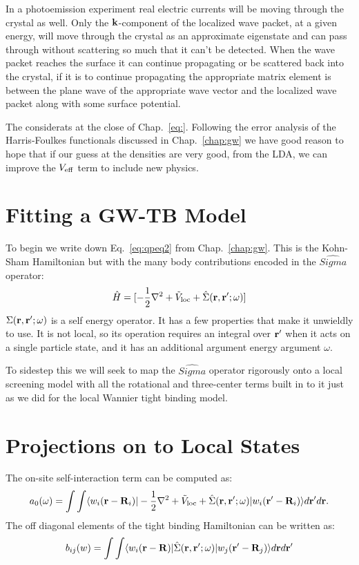 In a photoemission experiment real electric currents will be moving through 
the crystal as well. Only the ${\bf k}$-component of the localized wave packet, 
at a given energy, will move through the crystal as 
an approximate eigenstate and can pass through without scattering 
so much that it can't be detected.
When the wave packet reaches the surface it can continue propagating
or be scattered back into the crystal, if it is to continue 
propagating the appropriate matrix element
is between the plane wave of the appropriate wave vector and 
the localized wave packet along with some surface potential.

The considerats at the close of Chap.~\ref{eq:}. Following the error 
analysis of the Harris-Foulkes functionals discussed in Chap.~\ref{chap:gw} 
we have good reason to hope that if our guess at the densities are very good, 
from the LDA, we can improve the $V_{\rm eff}$ term to include new physics.

\section{Fitting a GW-TB Model}
To begin we write down Eq.~\ref{eq:qpeq2} from Chap.~\ref{chap:gw}.
This is the Kohn-Sham Hamiltonian but with the many body contributions
encoded in the $\hat{Sigma}$ operator:
%
\begin{equation}
\hat{H} = [-\frac{1}{2}\nabla^{2} + \tilde{V}_{\rm loc} + \hat{\Sigma}({\bf r},{\bf r}';\omega)]
\end{equation}
%
$\Sigma({\bf r},{\bf r}';\omega)$ is a self energy operator. It has a few properties
that make it unwieldly to use. It is not local, so its operation requires an integral over
${\bf r}'$ when it acts on a single particle state, and it has an additional argument 
energy argument $\omega$. 

To sidestep this we will seek to map the $\hat{Sigma}$ operator 
rigorously onto a local screening model with all the rotational and
three-center terms built in to it just as we did for the local Wannier 
tight binding model.

\section{Projections on to Local States}
The on-site self-interaction term can be computed as:
%
\begin{equation}
a_{0}(\omega) = \int\int\langle w_{i}({\bf r}-{\bf R}_{i})|-\frac{1}{2}\nabla^{2} + \tilde{V}_{\rm loc} + \hat{\Sigma}({\bf r},{\bf r}';\omega)|w_{i}({\bf r}'-{\bf R}_{i})\rangle d{\bf r}'d{\bf r}.
\end{equation}
%
The off diagonal elements of the tight binding Hamiltonian can be written as:
%
\begin{equation}
b_{ij}(w) = \int\int\langle w_{i}({\bf r}-{\bf R})|\hat{\Sigma}({\bf r},{\bf r}';\omega)|w_{j}({\bf r}'-{\bf R}_{j})\rangle d{\bf r} d{\bf r}'
\end{equation}
